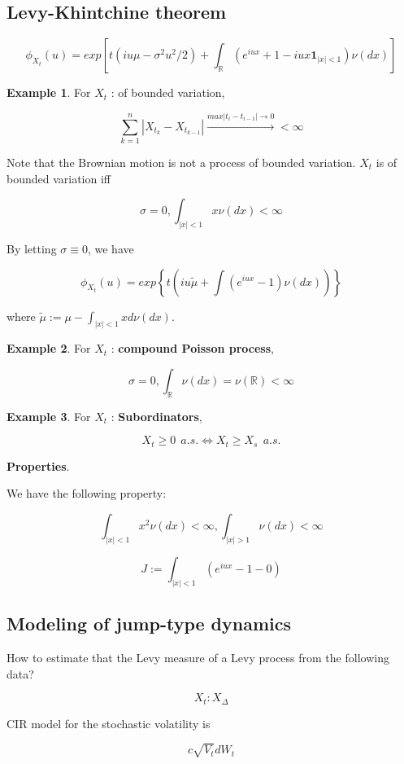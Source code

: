 \documentclass[12pt]{article}
\theoremstyle{nonumberbreak}
\begin{document}
\subsection{Levy-Khintchine theorem}


$$
\phi_{X_t}(u) = exp \left[ t (iu\mu - \sigma^2 u^2 /2) + \int_\mathbb{R} \left( e^{iux} + 1 - iux \mathbf{1}_{|x| < 1} \right) \nu (dx) \right] 
$$

\textbf{Example 1}. For $X_t$ : of bounded variation,

$$
\sum_{k=1}^n | X_{t_k} - X_{t_{k-1}} |  \overset{max |t_i - t_{i-1}| \to 0}{\longrightarrow} < \infty
$$

Note that the Brownian motion is not a process of bounded variation. $X_t$ is of bounded variation iff

$$
\sigma=0, \int_{|x|<1} x\nu (dx) < \infty
$$

By letting $\sigma \equiv 0$, we have

$$
\phi_{X_t}(u) = exp\left\{ t \left( iu \tilde{\mu} + \int(e^{iux}-1)\nu(dx) \right) \right\}
$$

where $\tilde{\mu} := \mu - \int_{|x|<1} x d\nu(dx)$. 


\textbf{Example 2}. For $X_t$ : \textbf{compound Poisson process}, 

$$
\sigma = 0, \int_\mathbb{R} \nu(dx) = \nu(\mathbb{R}) < \infty
$$


\textbf{Example 3}. For $X_t$ : \textbf{Subordinators}, 

$$
X_t \ge 0 \ \ a.s. \Leftrightarrow X_t \ge X_s \ \ a.s.
$$




\textbf{Properties}. 

We have the following property:

$$
\int_{|x| < 1} x^2 \nu (dx) < \infty, \int_{|x| > 1} \nu (dx) < \infty
$$

$$
J := \int_{|x|<1} \left( e^{iux} -1 -0  \right)
$$



\subsection{Modeling of jump-type dynamics}

How to estimate that the Levy measure of a Levy process from the following data? 

$$
X_t: X_\Delta
$$


CIR model for the stochastic volatility is 

$$
c \sqrt{V_t} d W_t
$$
\end{document}
